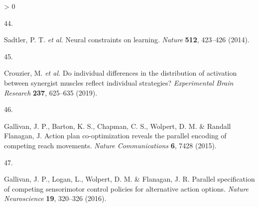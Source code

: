 \documentclass[
  a4paper,
]{article}
\newlength{\cslhangindent}
\newlength{\csllabelwidth}
\newenvironment{CSLReferences}[2] %
 {%
  \setlength{\parindent}{0pt}
  \ifodd #1 \everypar{\setlength{\hangindent}{\cslhangindent}}\ignorespaces\fi
  \ifnum #2 > 0
  \setlength{\parskip}{#2\baselineskip}
  \fi
 }%
 {}
\newcommand{\CSLLeftMargin}[1]{\parbox[t]{\csllabelwidth}{#1}}
\newcommand{\CSLRightInline}[1]{\parbox[t]{\linewidth - \csllabelwidth}{#1}\break}
\begin{document}
\begin{CSLReferences}{0}{0}
\leavevmode\hypertarget{ref-sadtlerNeuralConstraintsLearning2014}{}%
\CSLLeftMargin{44. }
\CSLRightInline{Sadtler, P. T. \emph{et al.} Neural constraints on
learning. \emph{Nature} \textbf{512}, 423--426 (2014).}

\leavevmode\hypertarget{ref-crouzierIndividualDifferencesDistribution2019}{}%
\CSLLeftMargin{45. }
\CSLRightInline{Crouzier, M. \emph{et al.} Do individual differences in
the distribution of activation between synergist muscles reflect
individual strategies? \emph{Experimental Brain Research} \textbf{237},
625--635 (2019).}

\leavevmode\hypertarget{ref-gallivanActionPlanCooptimization2015}{}%
\CSLLeftMargin{46. }
\CSLRightInline{Gallivan, J. P., Barton, K. S., Chapman, C. S., Wolpert,
D. M. \& Randall Flanagan, J. Action plan co-optimization reveals the
parallel encoding of competing reach movements. \emph{Nature
Communications} \textbf{6}, 7428 (2015).}

\leavevmode\hypertarget{ref-gallivanParallelSpecificationCompeting2016}{}%
\CSLLeftMargin{47. }
\CSLRightInline{Gallivan, J. P., Logan, L., Wolpert, D. M. \& Flanagan,
J. R. Parallel specification of competing sensorimotor control policies
for alternative action options. \emph{Nature Neuroscience} \textbf{19},
320--326 (2016).}

\end{CSLReferences}
\end{document}
